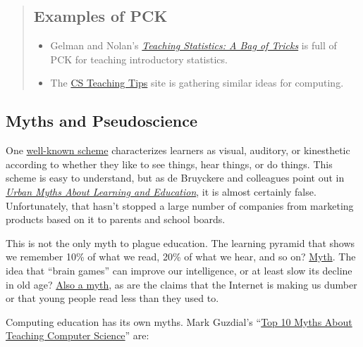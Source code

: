 \begin{quotation}   %
\subsection*{Examples of PCK}

\begin{itemize}
\item Gelman and Nolan's \emph{\href{http://www.amazon.com/Teaching-Statistics-Tricks-Andrew-Gelman/dp/0198572247/}{Teaching Statistics: A Bag of Tricks}}
is full of PCK for teaching introductory statistics.
\item The \href{http://csteachingtips.org/}{CS Teaching Tips} site
is gathering similar ideas for computing.
\end{itemize}
\end{quotation}   %

\subsection*{Myths and Pseudoscience}

One \href{https://en.wikipedia.org/wiki/Learning\_styles\#Learning\_modalities}{well-known scheme}
characterizes learners as visual, auditory, or kinesthetic
according to whether they like to see things, hear things, or do things.
This scheme is easy to understand,
but as de Bruyckere and colleagues point out in \emph{\href{https://www.amazon.com/Urban-Myths-about-Learning-Education/dp/0128015373/}{Urban Myths About Learning and Education}},
it is almost certainly false.
Unfortunately,
that hasn't stopped a large number of companies from marketing products based on it
to parents and school boards.

This is not the only myth to plague education.
The learning pyramid that shows we remember 10\% of what we read,
20\% of what we hear,
and so on?
\href{https://www.amazon.com/Urban-Myths-about-Learning-Education/dp/0128015373/}{Myth}.
The idea that ``brain games'' can improve our intelligence,
or at least slow its decline in old age?
\href{https://www.amazon.com/Urban-Myths-about-Learning-Education/dp/0128015373/}{Also a myth},
as are the claims that the Internet is making us dumber
or that young people read less than they used to.

Computing education has its own myths.
Mark Guzdial's ``\href{\{\{ page.root \}\}/files/papers/guzdial-10-myths-2015.pdf}{Top 10 Myths About Teaching Computer Science}''
are:

